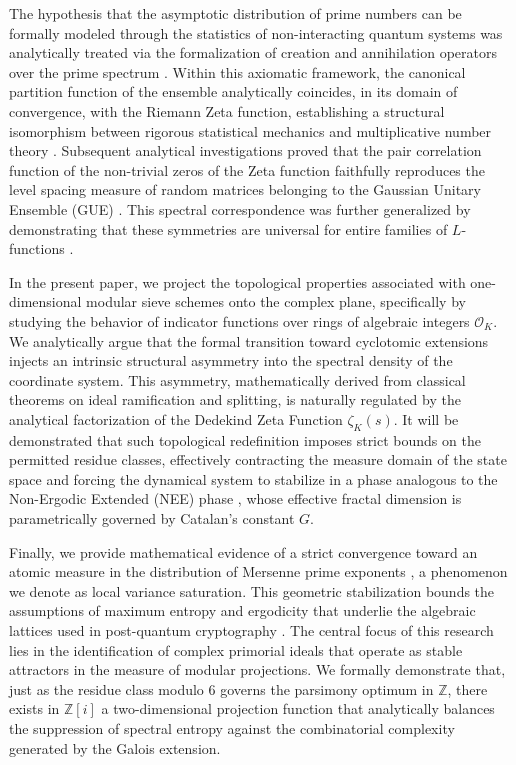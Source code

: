 \documentclass{article}
\numberwithin{equation}{section}
\theoremstyle{plain}
\theoremstyle{definition}
\begin{document}
The hypothesis that the asymptotic distribution of prime numbers can be formally modeled through the statistics of non-interacting quantum systems was analytically treated via the formalization of creation and annihilation operators over the prime spectrum \cite{Julia1990}. Within this axiomatic framework, the canonical partition function of the ensemble analytically coincides, in its domain of convergence, with the Riemann Zeta function, establishing a structural isomorphism between rigorous statistical mechanics and multiplicative number theory \cite{Spector1990}. Subsequent analytical investigations proved that the pair correlation function of the non-trivial zeros of the Zeta function faithfully reproduces the level spacing measure of random matrices belonging to the Gaussian Unitary Ensemble (GUE) \cite{Montgomery1973}. This spectral correspondence was further generalized by demonstrating that these symmetries are universal for entire families of $L$-functions \cite{KatzSarnak1999, BerryKeating1999}.

In the present paper, we project the topological properties associated with one-dimensional modular sieve schemes onto the complex plane, specifically by studying the behavior of indicator functions over rings of algebraic integers $\mathcal{O}_K$. We analytically argue that the formal transition toward cyclotomic extensions injects an intrinsic structural asymmetry into the spectral density of the coordinate system. This asymmetry, mathematically derived from classical theorems on ideal ramification and splitting, is naturally regulated by the analytical factorization of the Dedekind Zeta Function $\zeta_K(s)$. It will be demonstrated that such topological redefinition imposes strict bounds on the permitted residue classes, effectively contracting the measure domain of the state space and forcing the dynamical system to stabilize in a phase analogous to the Non-Ergodic Extended (NEE) phase \cite{Kravtsov2015, Khaymovich2021}, whose effective fractal dimension is parametrically governed by Catalan's constant $G$.

Finally, we provide mathematical evidence of a strict convergence toward an atomic measure in the distribution of Mersenne prime exponents \cite{Bourne2021}, a phenomenon we denote as local variance saturation. This geometric stabilization bounds the assumptions of maximum entropy and ergodicity that underlie the algebraic lattices used in post-quantum cryptography \cite{Wenger2024, Peikert2009}. The central focus of this research lies in the identification of complex primorial ideals that operate as stable attractors in the measure of modular projections. We formally demonstrate that, just as the residue class modulo $6$ governs the parsimony optimum in $\mathbb{Z}$, there exists in $\mathbb{Z}[i]$ a two-dimensional projection function that analytically balances the suppression of spectral entropy against the combinatorial complexity generated by the Galois extension.
\end{document}
